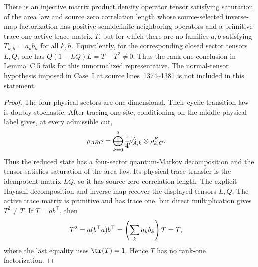 \begin{lemma}
    \label{thm:mpdo_sal_zcl_rank_one_normalization_obstruction}
    \leanok
    There is an injective matrix product density operator tensor satisfying
    saturation of the area law and source zero correlation length whose
    source-selected inverse-map factorization has positive semidefinite
    neighboring operators and a primitive trace-one active trace matrix $T$,
    but for which there are no families $a,b$ satisfying
    $T_{k,h}=a_kb_h$ for all $k,h$. Equivalently, for the corresponding closed
    sector tensors $L,Q$, one has $Q(1-LQ)L=T-T^2\ne0$. Thus the rank-one
    conclusion in Lemma~C.5 fails for this unnormalized representative. The
    normal-tensor hypothesis imposed in Case~I at source lines~1374--1381 is
    not included in this statement.
\end{lemma}

\begin{proof}
    \leanok
    The four physical sectors are one-dimensional. Their cyclic transition
    law is doubly stochastic. After tracing one site, conditioning on the
    middle physical label gives, at every admissible cut,
    \begin{align}
        \rho_{ABC}
         & =\bigoplus_{k=0}^{3}\frac14
        \rho^{L}_{A,k}\otimes\rho^{R}_{k,C}. \notag
    \end{align}
    Thus the reduced state has a four-sector quantum-Markov decomposition and
    the tensor satisfies saturation of the area law. Its physical-trace
    transfer is the idempotent matrix $LQ$, so it has source zero correlation
    length. The explicit Hayashi decomposition and inverse map recover the
    displayed tensors $L,Q$. The active trace matrix is primitive and has
    trace one, but direct multiplication gives $T^2\ne T$. If
    $T=ab^\top$, then
    \begin{align}
        T^2
         & =a(b^\top a)b^\top
        =\left(\sum_k a_kb_k\right)T
        =T, \notag
    \end{align}
    where the last equality uses $\tr(T)=1$. Hence $T$ has no rank-one
    factorization.
\end{proof}

